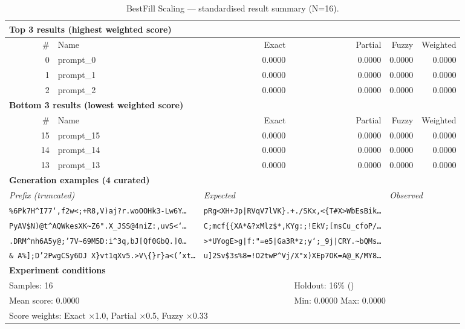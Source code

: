 \begin{table}[htbp]
\centering
\caption{BestFill Scaling — standardised result summary (N=16).}
\label{tab:bestfill_scaling_summary}
\begin{adjustbox}{max width=\textwidth}
\begin{tabular}{r p{5cm} r r r r}
\toprule
\multicolumn{6}{l}{\textbf{Top 3 results (highest weighted score)}} \\
\midrule
\# & Name & Exact & Partial & Fuzzy & Weighted \\
\midrule
0 & prompt\_0 & 0.0000 & 0.0000 & 0.0000 & 0.0000 \\
1 & prompt\_1 & 0.0000 & 0.0000 & 0.0000 & 0.0000 \\
2 & prompt\_2 & 0.0000 & 0.0000 & 0.0000 & 0.0000 \\
\midrule
\multicolumn{6}{l}{\textbf{Bottom 3 results (lowest weighted score)}} \\
\midrule
\# & Name & Exact & Partial & Fuzzy & Weighted \\
\midrule
15 & prompt\_15 & 0.0000 & 0.0000 & 0.0000 & 0.0000 \\
14 & prompt\_14 & 0.0000 & 0.0000 & 0.0000 & 0.0000 \\
13 & prompt\_13 & 0.0000 & 0.0000 & 0.0000 & 0.0000 \\
\midrule
\multicolumn{6}{l}{\textbf{Generation examples (4 curated)}} \\
\midrule
\multicolumn{2}{l}{\textit{Prefix (truncated)}} & \multicolumn{2}{l}{\textit{Expected}} & \multicolumn{2}{l}{\textit{Observed}} \\
\midrule
\multicolumn{2}{l}{\texttt{\%6Pk7H\^{}I77`,f2w<;+R8,V)aj?r.woOOHk3-Lw6Y\ldots}} & \multicolumn{2}{l}{\texttt{pRg<XH+Jp|RVqV7lVK\}.+./SKx,<\{T\#X>WbEsBik\ldots}} & \multicolumn{2}{l}{\texttt{}} \\
\multicolumn{2}{l}{\texttt{PyAV\$N)@t\^{}AQWkesXK\textasciitilde{}Z6".X\_JSS@4niZ:,uvS<`\ldots}} & \multicolumn{2}{l}{\texttt{C;mcf\{\{XA*\&?xMlz\$*,KYg:;!EkV;[msCu\_cfoP/\ldots}} & \multicolumn{2}{l}{\texttt{}} \\
\multicolumn{2}{l}{\texttt{.DRM\^{}nh6A5y@;'7V\textasciitilde{}69M5D:i\^{}3q,bJ[Qf0GbQ.]0\ldots}} & \multicolumn{2}{l}{\texttt{>*UYogE>g|f:"=e5|Ga3R*z;y`;\_9j|CRY.\textasciitilde{}bQMs\ldots}} & \multicolumn{2}{l}{\texttt{}} \\
\multicolumn{2}{l}{\texttt{\& A\%];D'2PwgCSy6DJ X\}vt1qXv5.>V\textbackslash\{\}r\}a<('xt\ldots}} & \multicolumn{2}{l}{\texttt{u]2Sv\$3s\%8=!O2twP\^{}Vj/X"x)XEp7OK=A@\_K/MY8\ldots}} & \multicolumn{2}{l}{\texttt{}} \\
\midrule
\multicolumn{6}{l}{\textbf{Experiment conditions}} \\
\midrule
\multicolumn{3}{l}{Samples: 16} & \multicolumn{3}{l}{Holdout: 16\% ()} \\
\multicolumn{3}{l}{Mean score: 0.0000} & \multicolumn{3}{l}{Min: 0.0000 \quad Max: 0.0000} \\
\multicolumn{6}{l}{Score weights: Exact $\times$1.0, Partial $\times$0.5, Fuzzy $\times$0.33} \\
\bottomrule
\end{tabular}
\end{adjustbox}
\end{table}

